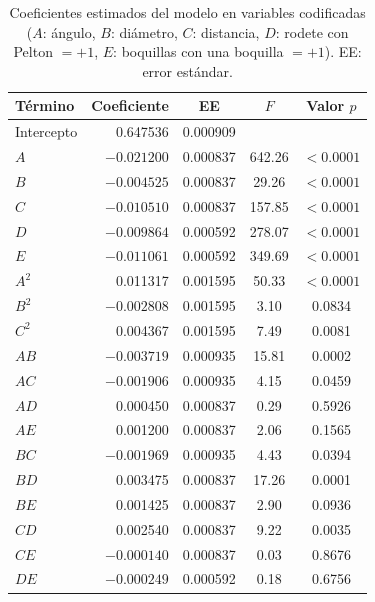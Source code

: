 \begin{table}[ht]
\centering
\caption{Coeficientes estimados del modelo en variables codificadas ($A$: ángulo, $B$: diámetro, $C$: distancia, $D$: rodete con Pelton $= +1$, $E$: boquillas con una boquilla $= +1$). EE: error estándar.}
\label{tab:coeficientes}
\begin{tabular}{lrccc}
\toprule
Término & Coeficiente & EE & $F$ & Valor $p$ \\
\midrule
Intercepto & 0.647536 & 0.000909 &        &            \\
$A$        & $-0.021200$ & 0.000837 & 642.26 & $<0.0001$ \\
$B$        & $-0.004525$ & 0.000837 &  29.26 & $<0.0001$ \\
$C$        & $-0.010510$ & 0.000837 & 157.85 & $<0.0001$ \\
$D$        & $-0.009864$ & 0.000592 & 278.07 & $<0.0001$ \\
$E$        & $-0.011061$ & 0.000592 & 349.69 & $<0.0001$ \\
$A^2$      &  0.011317 & 0.001595 &  50.33 & $<0.0001$ \\
$B^2$      & $-0.002808$ & 0.001595 &   3.10 & 0.0834 \\
$C^2$      &  0.004367 & 0.001595 &   7.49 & 0.0081 \\
$AB$       & $-0.003719$ & 0.000935 &  15.81 & 0.0002 \\
$AC$       & $-0.001906$ & 0.000935 &   4.15 & 0.0459 \\
$AD$       &  0.000450 & 0.000837 &   0.29 & 0.5926 \\
$AE$       &  0.001200 & 0.000837 &   2.06 & 0.1565 \\
$BC$       & $-0.001969$ & 0.000935 &   4.43 & 0.0394 \\
$BD$       &  0.003475 & 0.000837 &  17.26 & 0.0001 \\
$BE$       &  0.001425 & 0.000837 &   2.90 & 0.0936 \\
$CD$       &  0.002540 & 0.000837 &   9.22 & 0.0035 \\
$CE$       & $-0.000140$ & 0.000837 &   0.03 & 0.8676 \\
$DE$       & $-0.000249$ & 0.000592 &   0.18 & 0.6756 \\
\bottomrule
\end{tabular}
\end{table}

